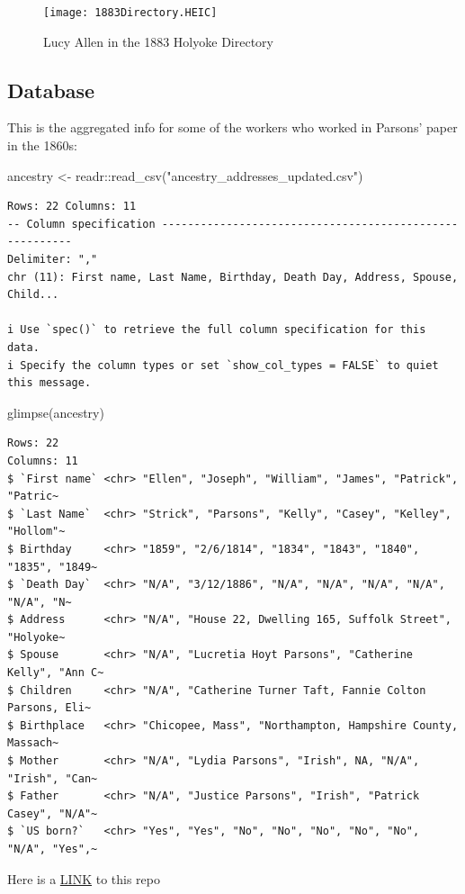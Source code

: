 \documentclass[
  letterpaper,
  DIV=11,
  numbers=noendperiod]{scrartcl}
\newenvironment{Shaded}{\begin{snugshade}}{\end{snugshade}}
\newcommand{\FunctionTok}[1]{\textcolor[rgb]{0.28,0.35,0.67}{#1}}
\newcommand{\NormalTok}[1]{\textcolor[rgb]{0.00,0.23,0.31}{#1}}
\newcommand{\OtherTok}[1]{\textcolor[rgb]{0.00,0.23,0.31}{#1}}
\newcommand{\SpecialCharTok}[1]{\textcolor[rgb]{0.37,0.37,0.37}{#1}}
\newcommand{\StringTok}[1]{\textcolor[rgb]{0.13,0.47,0.30}{#1}}
\begin{document}
\begin{figure}

{\centering \texttt{[image: 1883Directory.HEIC]}

}

\caption{\label{fig-sample12}Lucy Allen in the 1883 Holyoke Directory}

\end{figure}

\hypertarget{database}{%
\subsection{Database}\label{database}}

This is the aggregated info for some of the workers who worked in
Parsons' paper in the 1860s:

\begin{Shaded}
\begin{Highlighting}[]
\NormalTok{ancestry }\OtherTok{\textless{}{-}}\NormalTok{ readr}\SpecialCharTok{::}\FunctionTok{read\_csv}\NormalTok{(}\StringTok{"ancestry\_addresses\_updated.csv"}\NormalTok{)}
\end{Highlighting}
\end{Shaded}

\begin{verbatim}
Rows: 22 Columns: 11
-- Column specification --------------------------------------------------------
Delimiter: ","
chr (11): First name, Last Name, Birthday, Death Day, Address, Spouse, Child...

i Use `spec()` to retrieve the full column specification for this data.
i Specify the column types or set `show_col_types = FALSE` to quiet this message.
\end{verbatim}

\begin{Shaded}
\begin{Highlighting}[]
\FunctionTok{glimpse}\NormalTok{(ancestry)}
\end{Highlighting}
\end{Shaded}

\begin{verbatim}
Rows: 22
Columns: 11
$ `First name` <chr> "Ellen", "Joseph", "William", "James", "Patrick", "Patric~
$ `Last Name`  <chr> "Strick", "Parsons", "Kelly", "Casey", "Kelley", "Hollom"~
$ Birthday     <chr> "1859", "2/6/1814", "1834", "1843", "1840", "1835", "1849~
$ `Death Day`  <chr> "N/A", "3/12/1886", "N/A", "N/A", "N/A", "N/A", "N/A", "N~
$ Address      <chr> "N/A", "House 22, Dwelling 165, Suffolk Street", "Holyoke~
$ Spouse       <chr> "N/A", "Lucretia Hoyt Parsons", "Catherine Kelly", "Ann C~
$ Children     <chr> "N/A", "Catherine Turner Taft, Fannie Colton Parsons, Eli~
$ Birthplace   <chr> "Chicopee, Mass", "Northampton, Hampshire County, Massach~
$ Mother       <chr> "N/A", "Lydia Parsons", "Irish", NA, "N/A", "Irish", "Can~
$ Father       <chr> "N/A", "Justice Parsons", "Irish", "Patrick Casey", "N/A"~
$ `US born?`   <chr> "Yes", "Yes", "No", "No", "No", "No", "No", "N/A", "Yes",~
\end{verbatim}

Here is a
\href{https://github.com/STAT210-S23/Parsons_Paper_Register}{LINK} to
this repo
\end{document}
